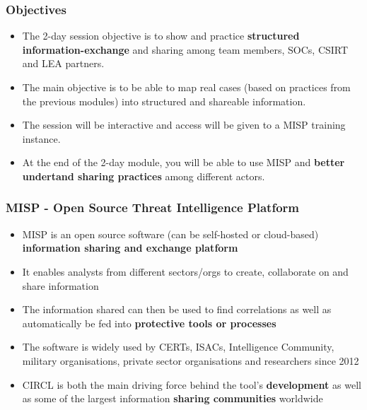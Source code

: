 
\begin{frame}[t,plain]
\titlepage
\end{frame}

\begin{frame}
    \frametitle{Objectives}
    \begin{itemize}
        \item The 2-day session objective is to show and practice {\bf structured information-exchange} and sharing among team members, SOCs, CSIRT and LEA partners.
        \item The main objective is to be able to map real cases (based on practices from the previous modules) into structured and shareable information.
        \item The session will be interactive and access will be given to a MISP training instance. 
        \item At the end of the 2-day module, you will be able to use MISP and {\bf better undertand sharing practices} among different actors.
    \end{itemize}
\end{frame}

\begin{frame}
\frametitle{MISP - Open Source Threat Intelligence Platform}
        \begin{itemize}
                \item MISP is an open source software (can be self-hosted or cloud-based) {\bf information sharing and exchange platform}
                \item It enables analysts from different sectors/orgs to create, collaborate on and share information
                \item The information shared can then be used to find correlations as well as automatically be fed into {\bf protective tools or processes}
                \item The software is widely used by CERTs, ISACs, Intelligence Community, military organisations, private sector organisations and researchers since 2012
                \item CIRCL is both the main driving force behind the tool's {\bf development} as well as some of the largest information {\bf sharing communities} worldwide
        \end{itemize}
\end{frame}

